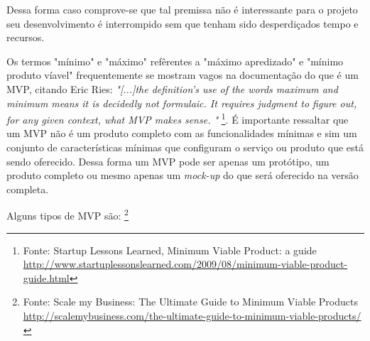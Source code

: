     \par Dessa forma caso comprove-se que tal premissa não é interessante para o projeto seu desenvolvimento é interrompido sem que tenham sido desperdiçados tempo e recursos.
    \par Os termos "mínimo" e "máximo" refêrentes a "máximo apredizado" e "mínimo produto víavel" frequentemente se mostram vagos na documentação do que é um MVP, citando Eric Ries: \emph{"[...]the definition's use of the words maximum and minimum means it is decidedly not formulaic. It requires judgment to figure out, for any given context, what MVP makes sense. "} \footnote{Fonte: Startup Lessons Learned, Minimum Viable Product: a guide \url{http://www.startuplessonslearned.com/2009/08/minimum-viable-product-guide.html}}. É importante ressaltar que um MVP não é um produto completo com as funcionalidades  mínimas e sim um conjunto de características mínimas que configuram o serviço ou produto que está sendo oferecido. Dessa forma um MVP pode ser apenas um protótipo, um produto completo ou mesmo apenas um \emph{mock-up} do que será oferecido na versão completa.
    \par Alguns tipos de MVP são: \footnote{ Fonte: Scale my Business: The Ultimate Guide to Minimum Viable Products  \url{http://scalemybusiness.com/the-ultimate-guide-to-minimum-viable-products/}}
